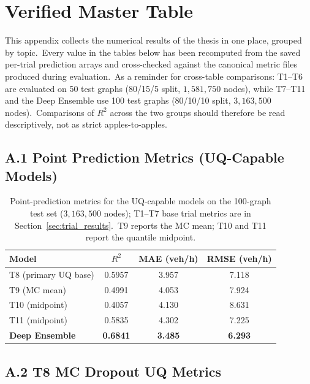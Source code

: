 
\chapter{Verified Master Table}\label{app:master_table}

This appendix collects the numerical results of the thesis in one place, grouped by topic.\ Every value in the tables below has been recomputed from the saved per-trial prediction arrays and cross-checked against the canonical metric files produced during evaluation.\ As a reminder for cross-table comparisons: T1--T6 are evaluated on 50 test graphs (80/15/5 split, $1{,}581{,}750$ nodes), while T7--T11 and the Deep Ensemble use 100 test graphs (80/10/10 split, $3{,}163{,}500$ nodes).\ Comparisons of $R^2$ across the two groups should therefore be read descriptively, not as strict apples-to-apples.

\section*{A.1 Point Prediction Metrics (UQ-Capable Models)}\label{app:tab:point}

\begin{table}[H]
\centering
\caption[Verified point-prediction metrics, UQ-capable models]{Point-prediction metrics for the UQ-capable models on the 100-graph test set ($3{,}163{,}500$ nodes); T1--T7 base trial metrics are in Section~\ref{sec:trial_results}.\ T9 reports the MC mean; T10 and T11 report the quantile midpoint.}
\label{tab:app_point}
\begin{tabular}{lccc}
\toprule
Model & $R^2$ & MAE (veh/h) & RMSE (veh/h) \\
\midrule
T8 (primary UQ base) & 0.5957 & 3.957 & 7.118 \\
T9 (MC mean) & 0.4991 & 4.053 & 7.924 \\
T10 (midpoint) & 0.4057 & 4.130 & 8.631 \\
T11 (midpoint) & 0.5835 & 4.302 & 7.225 \\
\textbf{Deep Ensemble} & \textbf{0.6841} & \textbf{3.485} & \textbf{6.293} \\
\bottomrule
\end{tabular}
\end{table}

\section*{A.2 T8 MC Dropout UQ Metrics}\label{app:tab:t8mc}

